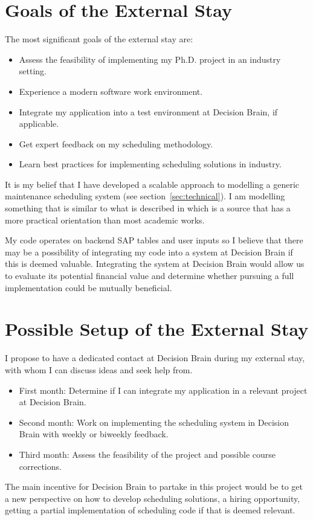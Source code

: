 \section{Goals of the External Stay}
The most significant goals of the external stay are:

\begin{itemize}
	\item Assess the feasibility of implementing my Ph.D. project in an industry setting.
	\item Experience a modern software work environment.
	\item Integrate my application into a test environment at Decision Brain, if applicable.
	\item Get expert feedback on my scheduling methodology. 
	\item Learn best practices for implementing scheduling solutions in industry.
\end{itemize}

It is my belief that I have developed a scalable approach to modelling a generic 
maintenance scheduling system (see section~\ref{sec:technical}). I am 
modelling something that is similar to what is described in \citet{palmerMaintenancePlanningScheduling2019} 
which is a source that has a more practical orientation than most academic works. 

My code operates on backend SAP tables and user inputs so I believe that there may be a possibility of integrating my 
code into a system at Decision Brain if this is deemed valuable. Integrating the system at Decision 
Brain would allow us to evaluate its potential financial value and determine whether pursuing a
full implementation could be mutually beneficial.

\newpage
\section{Possible Setup of the External Stay}
I propose to have a dedicated contact at Decision Brain during my external stay, with whom I can discuss ideas and seek help from.

\begin{itemize}
	\item First month: Determine if I can integrate my application in a relevant project at Decision Brain.
	\item Second month: Work on implementing the scheduling system in Decision Brain with weekly or biweekly feedback.
	\item Third month: Assess the feasibility of the project and possible course corrections.
\end{itemize}

The main incentive for Decision Brain to partake in this project would be to get a new perspective on how to develop scheduling solutions,
a hiring opportunity, getting a partial implementation of scheduling code if that is deemed relevant.

